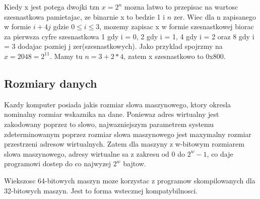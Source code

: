 \documentclass{article}
\begin{document}
Kiedy x jest potega dwojki tzn $x = 2^{n}$ mozna latwo to przepisac na wartosc szesnastkowa pamietajac, ze binarnie x to bedzie 1 i $n$ zer. Wiec dla n zapisanego w formie $i + 4j$ gdzie $0 \leq i \leq 3$, mozemy zapisac x w formie szesnastkowej biorac za pierwsza cyfre szesnastkowa 1 gdy i = 0, 2 gdy i = 1, 4 gdy i = 2 oraz 8 gdy i = 3 dodajac pozniej j zer(szesnastkowych). Jako przyklad spojrzmy na $x = 2048 = 2^{11}$. Mamy tu $n = 3 + 2*4$, zatem x szesnastkowo to 0x800.



\subsection{Rozmiary danych}

Kazdy komputer posiada jakis rozmiar slowa maszynowego, ktory okresla nominalny rozmiar wskaznika na dane. Poniewaz adres wirtualny jest zakodowany poprzez to slowo, najwazniejszym parametrem systemu zdeterminowanym poprzez rozmiar slowa maszynowego jest maxymalny rozmiar przestrzeni adresow wirtualnych. Zatem dla maszyny z w-bitowym rozmiarem slowa maszynowego, adresy wirtualne sa z zakresu od 0 do $2^{w} -1$, co daje programowi dostep do co najwyzej $2^{w}$ bajtow.

\vspace{5mm}

Wiekszosc 64-bitowych maszyn moze korzystac z programow skompilowanych dla 32-bitowych maszyn. Jest to forma wstecznej kompatybilnosci.
\end{document}
